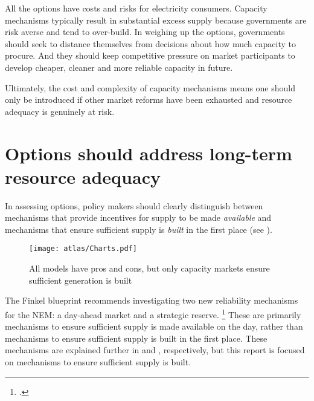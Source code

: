 \documentclass[FrontPage]{grattan}
\begin{document}
All the options have costs and risks for electricity consumers. Capacity mechanisms typically result in substantial excess supply because governments are risk averse and tend to over-build. In weighing up the options, governments should seek to distance themselves from decisions about how much capacity to procure. And they should keep competitive pressure on market participants to develop cheaper, cleaner and more reliable capacity in future.

Ultimately, the cost and complexity of capacity mechanisms means one should only be introduced if other market reforms have been exhausted and resource adequacy is genuinely at risk.

\section{Options should address long-term resource adequacy}\label{sec:options-should-address-long-term-resource-adequacy}
In assessing options, policy makers should clearly distinguish between mechanisms that provide incentives for supply to be made \emph{available} and mechanisms that ensure sufficient supply is \emph{built} in the first place (see ).

\begin{figure}
\caption{All models have pros and cons, but only capacity markets ensure sufficient generation is built}\label{fig:all-models-have-pros-and-cons-only-two-ensure-sufficient-generation-is-built}
\units{}
\texttt{[image: atlas/Charts.pdf]}
\end{figure}

The Finkel blueprint recommends investigating two new reliability mechanisms for the NEM: a day-ahead market and a strategic reserve.%
\footcite[100][103]{Finkel2017ReviewFinal}
These are primarily mechanisms to ensure sufficient supply is made available on the day, rather than mechanisms to ensure sufficient supply is built in the first place. These mechanisms are explained further in  and , respectively, but this report is focused on mechanisms to ensure sufficient supply is built.
\end{document}
